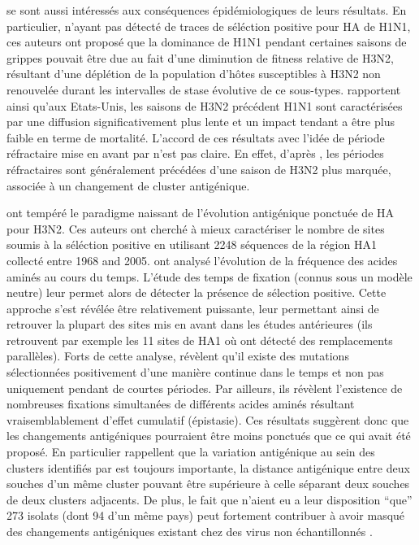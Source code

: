 \citet{Wolf2006} se sont aussi intéressés aux conséquences
épidémiologiques de leurs résultats. En particulier, n'ayant pas
détecté de traces de séléction positive pour HA de H1N1, ces auteurs
ont proposé que la dominance de H1N1 pendant certaines saisons de
grippes pouvait être due au fait d'une diminution de fitness relative
de H3N2, résultant d'une déplétion de la population d'hôtes
susceptibles à H3N2 non renouvelée durant les intervalles de stase
évolutive de ce sous-types. \citet{Wolf2006} rapportent ainsi qu'aux
Etats-Unis, les saisons de H3N2 précédent H1N1 sont caractérisées par
une diffusion significativement plus lente et un impact tendant a être
plus faible en terme de mortalité. L'accord de ces résultats avec
l'idée de période réfractaire mise en avant par \citet{Koelle2006}
n'est pas claire. En effet, d'après \citet{Koelle2006}, les périodes
réfractaires sont généralement précédées d'une saison de H3N2 plus
marquée, associée à un changement de cluster antigénique.

\citet{Shih2007} ont tempéré le paradigme naissant de l'évolution
antigénique ponctuée de HA pour H3N2. Ces auteurs ont cherché à mieux
caractériser le nombre de sites soumis à la séléction positive en
utilisant 2248 séquences de la région HA1 collecté entre 1968 and
2005.  \citet{Shih2007} ont analysé l'évolution de la fréquence des
acides aminés au cours du temps. L'étude des temps de fixation (connus
sous un modèle neutre) leur permet alors de détecter la présence de
sélection positive. Cette approche s'est révélée être relativement
puissante, leur permettant ainsi de retrouver la plupart des sites mis
en avant dans les études antérieures (ils retrouvent par exemple les
11 sites de HA1 où \citet{Wolf2006} ont détecté des remplacements
parallèles). Forts de cette analyse, \citet{Shih2007} révèlent qu'il
existe des mutations sélectionnées positivement d'une manière continue
dans le temps et non pas uniquement pendant de courtes périodes. Par
ailleurs, ils révèlent l'existence de nombreuses fixations simultanées
de différents acides aminés résultant vraisemblablement d'effet
cumulatif (épistasie). Ces résultats suggèrent donc que les
changements antigéniques pourraient être moins ponctués que ce qui
avait été proposé. En particulier \citet{Shih2007} rappellent que la
variation antigénique au sein des clusters identifiés par
\citet{Smith2004} est toujours importante, la distance antigénique
entre deux souches d'un même cluster pouvant être supérieure à celle
séparant deux souches de deux clusters adjacents. De plus, le fait que
\citet{Smith2004} n'aient eu a leur disposition ``que'' 273 isolats
(dont 94 d'un même pays) peut fortement contribuer à avoir masqué des
changements antigéniques existant chez des virus non échantillonnés
\citep{Shih2007}.


